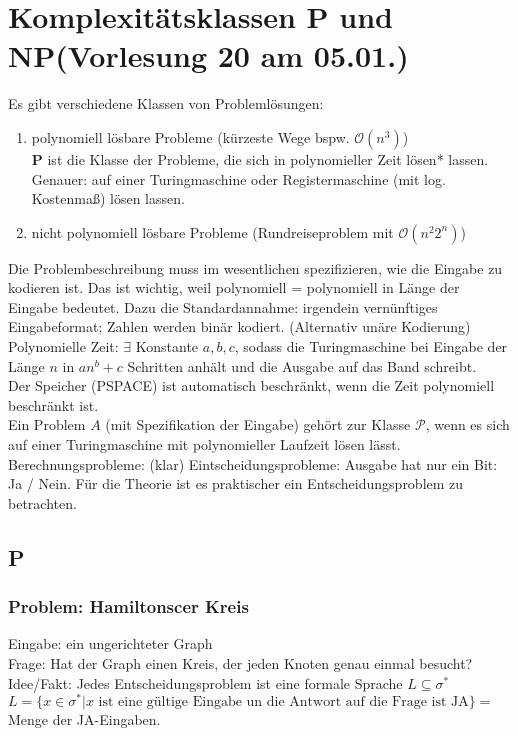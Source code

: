 \section{Komplexitätsklassen P und NP\tiny (Vorlesung 20 am 05.01.)}
Es gibt verschiedene Klassen von Problemlösungen:
\begin{enumerate}
\item polynomiell lösbare Probleme (kürzeste Wege bspw. $\mathcal{O}(n^3)$)\\
\textbf{P} ist die Klasse der Probleme, die sich in polynomieller Zeit lösen* lassen.\\
Genauer: auf einer Turingmaschine oder Registermaschine (mit log. Kostenmaß) lösen lassen.\\
\item nicht polynomiell lösbare Probleme (Rundreiseproblem mit $\mathcal{O}(n^2 2^n)$)
\end{enumerate}
Die Problembeschreibung muss im wesentlichen spezifizieren, wie die Eingabe zu kodieren ist. Das ist wichtig, weil polynomiell = polynomiell in Länge der Eingabe bedeutet. Dazu die Standardannahme: irgendein vernünftiges Eingabeformat; Zahlen werden binär kodiert. (Alternativ unäre Kodierung)\\
Polynomielle Zeit: $\exists$ Konstante $a,b,c$, sodass die Turingmaschine bei Eingabe der Länge $n$ in $an^b+c$ Schritten anhält und die Ausgabe auf das Band schreibt.\\
Der Speicher (PSPACE) ist automatisch beschränkt, wenn die Zeit polynomiell beschränkt ist.\\
Ein Problem $A$ (mit Spezifikation der Eingabe) gehört zur Klasse $\mathcal{P}$, wenn es sich auf einer Turingmaschine mit polynomieller Laufzeit lösen lässt.\\
Berechnungsprobleme: (klar)
Eintscheidungsprobleme: Ausgabe hat nur ein Bit: Ja / Nein.
Für die Theorie ist es praktischer ein Entscheidungsproblem zu betrachten.
\subsection{P}
\subsubsection{Problem: Hamiltonscer Kreis}
Eingabe: ein ungerichteter Graph\\
Frage: Hat der Graph einen Kreis, der jeden Knoten genau einmal besucht?\\
Idee/Fakt: Jedes Entscheidungsproblem ist eine formale Sprache $L \subseteq \sigma^*$\\
$L = \{ x \in \sigma^* | x\text{ ist eine gültige Eingabe un die Antwort auf die Frage ist JA}\} = $ Menge der JA-Eingaben.\\
